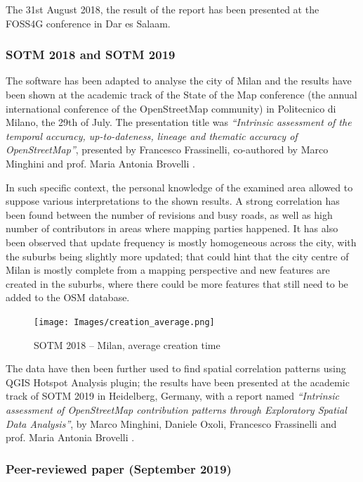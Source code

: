 \documentclass{Configuration_Files/PoliMi3i_thesis}
\begin{document}
The 31st August 2018, the result of the report has been presented at the FOSS4G conference in Dar es Salaam.

\subsubsection{SOTM 2018 and SOTM 2019}

The software has been adapted to analyse the city of Milan and the results have been shown at the academic track of the State of the Map conference (the annual international conference of the OpenStreetMap community) in Politecnico di Milano, the 29th of July. The presentation title was \textit{“Intrinsic assessment of the temporal accuracy, up-to-dateness, lineage and thematic accuracy of OpenStreetMap”}, presented by Francesco Frassinelli, co-authored by Marco Minghini and prof. Maria Antonia Brovelli \cite{frassinelliIntrinsicAssessmentTemporal2018}.

In such specific context, the personal knowledge of the examined area allowed to suppose various interpretations to the shown results. A strong correlation has been found between the number of revisions and busy roads, as well as high number of contributors in areas where mapping parties happened. It has also been observed that update frequency is mostly homogeneous across the city, with the suburbs being slightly more updated; that could hint that the city centre of Milan is mostly complete from a mapping perspective and new features are created in the suburbs, where there could be more features that still need to be added to the OSM database.

\begin{figure}[ht]
    \centering
    \texttt{[image: Images/creation\_average.png]}
    \caption{SOTM 2018 – Milan, average creation time}
    \label{fig:creation_average}
\end{figure}

The data have then been further used to find spatial correlation patterns using QGIS Hotspot Analysis plugin; the results have been presented at the academic track of SOTM 2019 in Heidelberg, Germany, with a report named \textit{“Intrinsic assessment of OpenStreetMap contribution patterns through Exploratory Spatial Data Analysis”}, by Marco Minghini, Daniele Oxoli, Francesco Frassinelli and prof. Maria Antonia Brovelli \cite{minghiniIntrinsicAssessmentOpenStreetMap2019}.

\subsubsection{Peer-reviewed paper (September 2019)}
\end{document}
